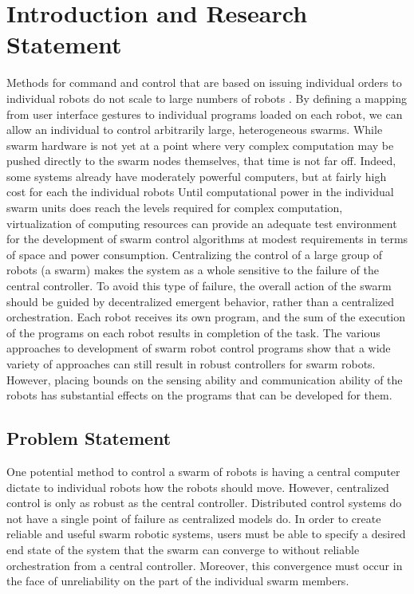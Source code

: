 \chapter{Introduction and Research Statement}

Methods for command and control that are based on issuing individual orders to individual robots do not scale to large numbers of robots \citep{WangSearchScale}.
By defining a mapping from user interface gestures to individual programs loaded on each robot, we can allow an individual to control arbitrarily large, heterogeneous swarms.
While swarm hardware is not yet at a point where very complex computation may be pushed directly to the swarm nodes themselves, that time is not far off. 
Indeed, some systems already have moderately powerful computers, but at fairly high cost for each the individual robots \citep{millard2017pi}
Until computational power in the individual swarm units does reach the levels required for complex computation, virtualization of computing resources can provide an adequate test environment for the development of swarm control algorithms at modest requirements in terms of space and power consumption. 
Centralizing the control of a large group of robots (a swarm) makes the system as a whole sensitive to the failure of the central controller. 
To avoid this type of failure, the overall action of the swarm should be guided by decentralized emergent behavior, rather than a centralized orchestration. 
Each robot receives its own program, and the sum of the execution of the programs on each robot results in completion of the task.
The various approaches to development of swarm robot control programs show that a wide variety of approaches can still result in robust controllers for swarm robots. 
However, placing bounds on the sensing ability and communication ability of the robots has substantial effects on the programs that can be developed for them. 

\section{Problem Statement} \label{section:Problem_Statement}

One potential method to control a swarm of robots is having a central computer dictate to individual robots how the robots should move.
However, centralized control is only as robust as the central controller. 
Distributed control systems do not have a single point of failure as centralized models do. 
In order to create reliable and useful swarm robotic systems, users must be able to specify a desired end state of the system that the swarm can converge to without reliable orchestration from a central controller. 
Moreover, this convergence must occur in the face of unreliability on the part of the individual swarm members. 

